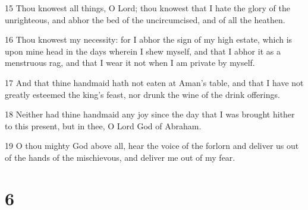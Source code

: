 \par 15 Thou knowest all things, O Lord; thou knowest that I hate the glory of the unrighteous, and abhor the bed of the uncircumcised, and of all the heathen.
\par 16 Thou knowest my necessity: for I abhor the sign of my high estate, which is upon mine head in the days wherein I shew myself, and that I abhor it as a menstruous rag, and that I wear it not when I am private by myself.
\par 17 And that thine handmaid hath not eaten at Aman's table, and that I have not greatly esteemed the king's feast, nor drunk the wine of the drink offerings.
\par 18 Neither had thine handmaid any joy since the day that I was brought hither to this present, but in thee, O Lord God of Abraham.
\par 19 O thou mighty God above all, hear the voice of the forlorn and deliver us out of the hands of the mischievous, and deliver me out of my fear.

\chapter{6}

